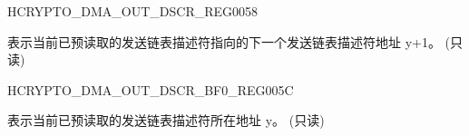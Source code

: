 \begin{register}{H}{CRYPTO\_DMA\_OUT\_DSCR\_REG}{\hexprefix{}0058}\label{regdesc:CRYPTODMAOUTDSCRREG}
%
\regnewline%
\begin{regdesc}\begin{reglist}
\label{fielddesc:CRYPTODMAOUTLINKDSCR}\item [CRYPTO\_DMA\_OUTLINK\_DSCR] 表示当前已预读取的发送链表描述符指向的下一个发送链表描述符地址 y+1。 (只读)
\end{reglist}\end{regdesc}
\end{register}


\begin{register}{H}{CRYPTO\_DMA\_OUT\_DSCR\_BF0\_REG}{\hexprefix{}005C}\label{regdesc:CRYPTODMAOUTDSCRBF0REG}
%
\regnewline%
\begin{regdesc}\begin{reglist}
\label{fielddesc:CRYPTODMAOUTLINKDSCRBF0}\item [CRYPTO\_DMA\_OUTLINK\_DSCR\_BF0] 表示当前已预读取的发送链表描述符所在地址 y。 (只读)
\end{reglist}\end{regdesc}
\end{register}




